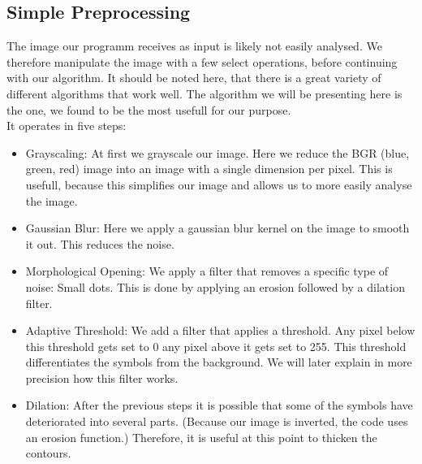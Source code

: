 \documentclass[12pt]{article}
\begin{document}
	\subsection{Simple Preprocessing}%
		The image our programm receives as input is likely not easily analysed.
		We therefore manipulate the image with a few select operations, before continuing with our algorithm.
		It should be noted here, that there is a great variety of different algorithms that work well.
		The algorithm we will be presenting here is the one, we found to be the most usefull for our purpose.\\
		It operates in five steps:
		\begin{itemize}
			\item Grayscaling: At first we grayscale our image. Here we reduce the BGR (blue, green, red) image into an image with a single dimension per pixel. This is usefull, because this simplifies our image and allows us to more easily analyse the image.
			\item Gaussian Blur: Here we apply a gaussian blur kernel on the image to smooth it out. This reduces the noise.
			\item Morphological Opening: We apply a filter that removes a specific type of noise: Small dots. This is done by applying an erosion followed by a dilation filter. %
			\item Adaptive Threshold: We add a filter that applies a threshold. Any pixel below this threshold gets set to 0 any pixel above it gets set to 255. %
			This threshold differentiates the symbols from the background.
			We will later explain in more precision how this filter works. %
			\item Dilation: After the previous steps it is possible that some of the symbols have deteriorated into several parts. %
			(Because our image is inverted, the code uses an erosion function.) %
			Therefore, it is useful at this point to thicken the contours.
		\end{itemize}
		
			
	
\end{document}
